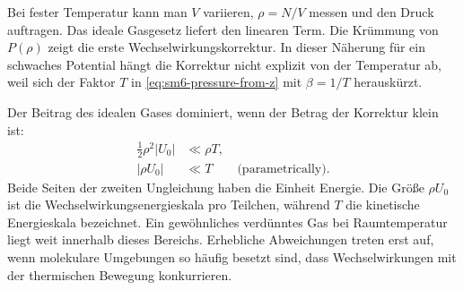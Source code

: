 \begin{classroomqa}
\end{classroomqa}

Bei fester Temperatur kann man \(V\) variieren, \(\rho=N/V\) messen und den Druck auftragen. Das ideale Gasgesetz liefert den linearen Term. Die Krümmung von \(P(\rho)\) zeigt die erste Wechselwirkungskorrektur. In dieser Näherung für ein schwaches Potential hängt die Korrektur nicht explizit von der Temperatur ab, weil sich der Faktor \(T\) in \eqref{eq:sm6-pressure-from-z} mit \(\beta=1/T\) herauskürzt.

\begin{classroomqa}
\end{classroomqa}

Der Beitrag des idealen Gases dominiert, wenn der Betrag der Korrektur klein ist:
\begin{equation}
 \begin{aligned}
 \frac{1}{2}\rho^2|U_0|&\ll \rho T,\\
 |\rho U_0|&\ll T
 \qquad\text{(parametrically)}.
 \end{aligned}
 \label{eq:sm6-ideal-validity}
\end{equation}
Beide Seiten der zweiten Ungleichung haben die Einheit Energie. Die Größe \(\rho U_0\) ist die Wechselwirkungsenergieskala pro Teilchen, während \(T\) die kinetische Energieskala bezeichnet. Ein gewöhnliches verdünntes Gas bei Raumtemperatur liegt weit innerhalb dieses Bereichs. Erhebliche Abweichungen treten erst auf, wenn molekulare Umgebungen so häufig besetzt sind, dass Wechselwirkungen mit der thermischen Bewegung konkurrieren.

